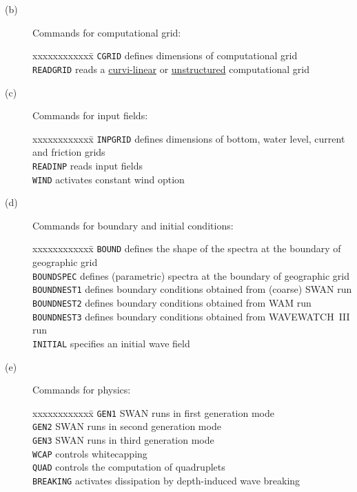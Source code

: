 \documentclass[12pt]{book}
\begin{document}
\begin{description}
  \item[(b)] Commands for computational grid:
\begin{tabbing}
xxxxxxxxxxxx\= \kill
{\tt CGRID}    \> defines dimensions of computational grid\\
{\tt READGRID} \> reads a \underline{curvi-linear} or \underline{unstructured} computational grid\\
\end{tabbing}
  \item[(c)] Commands for input fields:
\begin{tabbing}
xxxxxxxxxxxx\= \kill
{\tt INPGRID} \> defines dimensions of bottom, water level, current and friction grids\\
{\tt READINP} \> reads input fields\\
{\tt WIND}    \> activates constant wind option\\
\end{tabbing}
  \item[(d)] Commands for boundary and initial conditions:
\begin{tabbing}
xxxxxxxxxxxx\= \kill
{\tt BOUND}      \> defines the shape of the spectra at the boundary of geographic grid\\
{\tt BOUNDSPEC}  \> defines (parametric) spectra at the boundary of geographic grid\\
{\tt BOUNDNEST1} \> defines boundary conditions obtained from (coarse) SWAN run\\
{\tt BOUNDNEST2} \> defines boundary conditions obtained from WAM run\\
{\tt BOUNDNEST3} \> defines boundary conditions obtained from WAVEWATCH~III run\\
{\tt INITIAL}    \> specifies an initial wave field\\
\end{tabbing}
  \item[(e)] Commands for physics:
\begin{tabbing}
xxxxxxxxxxxx\= \kill
{\tt GEN1}     \> SWAN runs in first generation mode\\
{\tt GEN2}     \> SWAN runs in second generation mode\\
{\tt GEN3}     \> SWAN runs in third generation mode\\
{\tt WCAP}     \> controls whitecapping\\
{\tt QUAD}     \> controls the computation of quadruplets\\
{\tt BREAKING} \> activates dissipation by depth-induced wave breaking\\

\end{tabbing}
\end{description}
\end{document}
